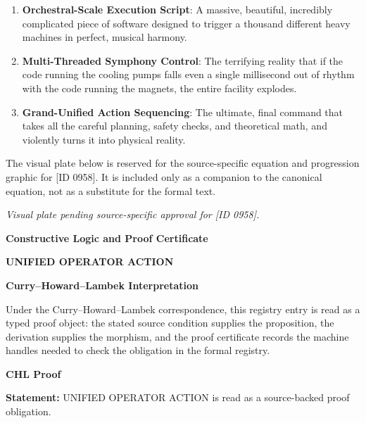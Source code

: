 \begin{enumerate}[leftmargin=1.6em,itemsep=6pt,topsep=4pt]
\item \textbf{Orchestral-Scale Execution Script}: A massive, beautiful, incredibly complicated piece of software designed to trigger a thousand different heavy machines in perfect, musical harmony.
\item \textbf{Multi-Threaded Symphony Control}: The terrifying reality that if the code running the cooling pumps falls even a single millisecond out of rhythm with the code running the magnets, the entire facility explodes.
\item \textbf{Grand-Unified Action Sequencing}: The ultimate, final command that takes all the careful planning, safety checks, and theoretical math, and violently turns it into physical reality.
\end{enumerate}

\begingroup\footnotesize\sloppy
The visual plate below is reserved for the source-specific equation and progression graphic for [ID 0958]. It is included only as a companion to the canonical equation, not as a substitute for the formal text.
\par\endgroup
\begingroup\footnotesize\itshape
Visual plate pending source-specific approval for [ID 0958].
\par\endgroup

\clearpage
\begingroup\tzpsupportsetup
\noindent\textbf{\fontsize{10.8pt}{12.8pt}\selectfont [ID 0958] Constructive Logic and Proof Certificate}\par
\noindent\textbf{\fontsize{10pt}{12pt}\selectfont UNIFIED OPERATOR ACTION}\par
\vspace{0.45em}
\begingroup
\footnotesize
\setlength{\parskip}{0.22em}
\setlength{\parindent}{0pt}
\noindent\textbf{Curry--Howard--Lambek Interpretation}\par
Under the Curry--Howard--Lambek correspondence, this registry entry is read as a typed proof
object: the stated source condition supplies the proposition, the derivation supplies the
morphism, and the proof certificate records the machine handles needed to check the obligation
in the formal registry.

\vspace{0.45em}
\noindent\textbf{CHL Proof}\par
\textbf{Statement:} UNIFIED OPERATOR ACTION is read as a source-backed proof obligation.


